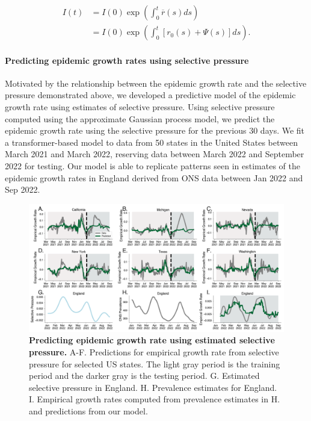 \documentclass[12pt,oneside,letterpaper]{article}
\begin{document}
\begin{align*}
    I(t) &= I(0) \exp\left(\int_{0}^{t} \overline{r}(s) ds\right)\\
         &= I(0) \exp \left(\int_{0}^{t} [r_{0}(s) + \Psi(s)]ds \right).
\end{align*}

\paragraph{Predicting epidemic growth rates using selective pressure}%

Motivated by the relationship between the epidemic growth rate and the selective pressure demonstrated above, we developed a predictive model of the epidemic growth rate using estimates of selective pressure.
Using selective pressure computed using the approximate Gaussian process model, we predict the epidemic growth rate using the selective pressure for the previous 30 days.
We fit a transformer-based model to data from 50 states in the United States between March 2021 and March 2022, reserving data between March 2022 and September 2022 for testing.
Our model is able to replicate patterns seen in estimates of the epidemic growth rates in England derived from ONS data between Jan 2022 and Sep 2022.


\begin{figure}[h]
    \centering
    \includegraphics[width=0.8\linewidth]{./figures/selective_pressure_prediction.png}
    \caption{\textbf{Predicting epidemic growth rate using estimated selective pressure.}
    A-F. Predictions for empirical growth rate from selective pressure for selected US states. 
    The light gray period is the training period and the darker gray is the testing period.
    G. Estimated selective pressure in England.
    H. Prevalence estimates for England.
    I. Empirical growth rates computed from prevalence estimates in H. and predictions from our model.
}
    \label{fig:selective_pressure_prediction}
\end{figure}
\end{document}
